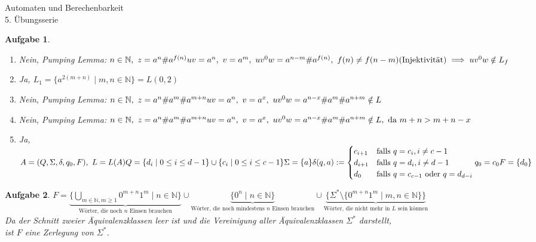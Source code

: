 \documentclass[11pt]{article}
\theoremstyle{break}
\newtheorem{task}{Aufgabe}
\begin{document}
\begin{center}
\Large{Automaten und Berechenbarkeit}\\
\large{5. Übungsserie}
\end{center}

\begin{task}
    \hfill\vspace{-5mm}
    \begin{enumerate} [label={(\alph*)}]
        \item Nein, Pumping Lemma: $n\in \mathbb{N},\ z = a^n \# a^{f(n)}\\ uv = a^n,\ v = a^m,\ uv^0 w = a^{n-m}\# a^{f(n)},\ f(n)\neq f(n-m)(\text{Injektivität})\implies uv^0 w \notin L_f$
        \item Ja, $L_1 = \{ a^{2(m+n)}\mid m,n\in \mathbb{N} \} = L(0,2)$
        \item Nein, Pumping Lemma: $n\in \mathbb{N},\ z = a^n\# a^m\# a^{m+n}\\ uv = a^n,\ v = a^x,\ uv^0 w = a^{n-x}\# a^m\# a^{n+m}\notin L$
        \item Nein, Pumping Lemma: $n\in \mathbb{N},\ z = a^n\# a^m\# a^{m+n}\\ uv = a^n,\ v = a^x,\ uv^0 w = a^{n-x}\# a^m\# a^{n+m}\notin L,\text{ da } m+n > m+n-x$
        \item Ja, $A = (Q, \Sigma, \delta, q_0, F),\ L = L(A) \vspace{2mm}\\
        Q = \{ d_i\mid 0\leq i\leq d-1 \}\cup \{ c_{i}\mid 0\leq i\leq c-1 \}\\
        \Sigma = \{a\}\\
        \delta(q, a) := \begin{cases}
            c_{i+1} & \text{falls } q = c_i, i\neq c-1\\
            d_{i+1} & \text{falls } q = d_i, i\neq d-1\\
            d_{0} & \text{falls } q = c_{c-1}\text{ oder } q = d_{d-i}
        \end{cases}\\
        q_0 = c_0 \\
        F = \{ d_0 \}\vspace{2mm}$
    \end{enumerate}
\end{task}

\begin{task}
    $F = \underbrace{\{\bigcup_{m\in \mathbb{N},m\geq 1} 0^{m+n} 1^{m}\mid n\in\mathbb{N}\}}_{\text{Wörter, die noch } n \text{ Einsen brauchen}}\cup \underbrace{\{0^{n}\mid n\in\mathbb{N}\}}_{\text{Wörter, die noch mindestens } n \text{ Einsen brauchen}}\cup \underbrace{\{\Sigma^*\setminus \{ 0^{m+n} 1^{m}\mid m,n\in\mathbb{N}\}\}}_{\text{Wörter, die nicht mehr in } L \text{ sein können}}$\\
    Da der Schnitt zweier Äquivalenzklassen leer ist und die Vereinigung aller Äquivalenzklassen $\Sigma^*$ darstellt,\\ist $F$ eine Zerlegung von $\Sigma^*$.
\end{task}
\end{document}
